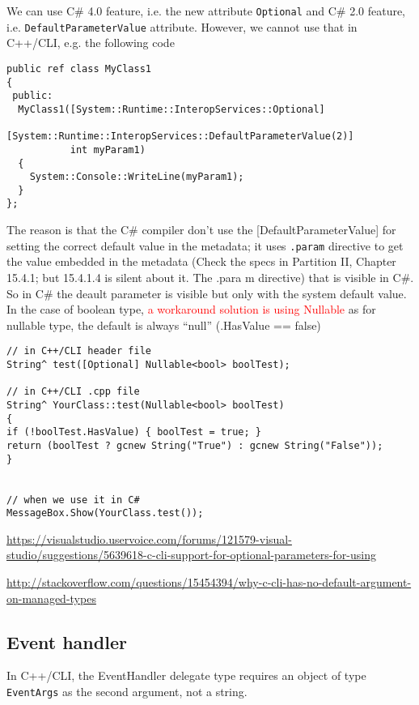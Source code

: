 We can use C\# 4.0 feature, i.e. the new attribute
\verb!Optional! and C\# 2.0 feature, i.e. \verb!DefaultParameterValue!
attribute. However, we cannot use that in C++/CLI, e.g. the following code
\begin{verbatim}
public ref class MyClass1
{
 public:
  MyClass1([System::Runtime::InteropServices::Optional]
           [System::Runtime::InteropServices::DefaultParameterValue(2)]
           int myParam1)                                            
  {
    System::Console::WriteLine(myParam1);
  }
};
\end{verbatim}

The reason is that the C\# compiler don't use the [DefaultParameterValue] for
setting the correct default value in the metadata; it uses \verb!.param!
directive to get the value embedded in the metadata (Check the specs
in Partition II, Chapter 15.4.1; but 15.4.1.4 is silent about it. The .para m
directive) that is visible in C\#.
So in C\# the deault parameter is visible but only with the system default value. 
In the case of boolean type, \textcolor{red}{a workaround solution is using
Nullable} as for nullable type, the default is always ``null'' (.HasValue ==
false)

\begin{verbatim}
// in C++/CLI header file
String^ test([Optional] Nullable<bool> boolTest);

// in C++/CLI .cpp file
String^ YourClass::test(Nullable<bool> boolTest) 
{ 
if (!boolTest.HasValue) { boolTest = true; } 
return (boolTest ? gcnew String("True") : gcnew String("False")); 
}


// when we use it in C#
MessageBox.Show(YourClass.test());
\end{verbatim}
\url{https://visualstudio.uservoice.com/forums/121579-visual-studio/suggestions/5639618-c-cli-support-for-optional-parameters-for-using}



\url{http://stackoverflow.com/questions/15454394/why-c-cli-has-no-default-argument-on-managed-types}

\subsection{Event handler}
\label{sec:event_handler_C++/CLI}

In C++/CLI, the EventHandler delegate type requires an object of type
\verb!EventArgs! as the second argument, not a string.

